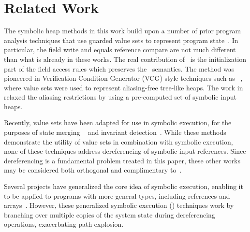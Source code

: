 \section{Related Work}
\label{sec:related}
%
The symbolic heap methods in this work build upon a
number of prior program analysis techniques that use guarded value sets to
represent program
state~\cite{Sen:2014,Torlak:2014,Yorsh:2008,Xie:2005,Dillig:2011,Elkarablieh:2009}. In particular, the field write and equals reference compare are not much different than what is already in these works. The real contribution of \symtxt\ is the initialization part of the field access rules which preserves the \gsetxt\ semantics.
The method was pioneered in Verification-Condition Generator (VCG) style techniques such as ~\cite{Xie:2005,Yorsh:2008}, where value sets were used to 
represent aliasing-free tree-like heaps. The work in~\cite{Dillig:2011} relaxed the aliasing restrictions by using a pre-computed set of symbolic input heaps.

Recently, value sets have been adapted for use in symbolic execution, for the purposes of state merging ~\cite{Sen:2014,Torlak:2014} and invariant detection~\cite{Ferrara:2014}. While these methods demonstrate the utility of value sets in combination with symbolic execution, none of these techniques address dereferencing of symbolic input references. Since dereferencing is a fundamental problem treated in this paper, these other works may be considered both orthogonal and complimentary to~\symtxt{}.

Several projects have generalized the core idea of symbolic execution,
enabling it to be applied to programs with more general types,
including references and
arrays~\cite{GSE03,KiasanKunit,Cadar:2008,Rosner:2015}. However, these
generalized symbolic execution (\gsetxt{}) techniques work by branching over
multiple copies of the system state during dereferencing operations,
exacerbating path explosion.

